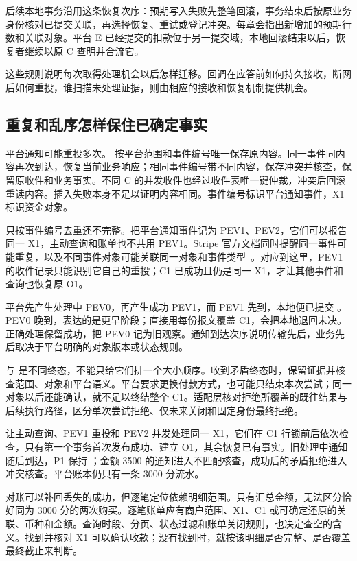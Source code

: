后续本地事务沿用这条恢复次序：预期写入失败先整笔回滚，事务结束后按原业务身份核对已提交关联，再选择恢复、重试或登记冲突。每章会指出新增加的预期行数和关联对象。平台 E 已经提交的扣款位于另一提交域，本地回滚结束以后，恢复者继续以原 C 查明并合流它。

这些规则说明每次取得处理机会以后怎样迁移。回调在应答前如何持久接收，断网后如何重投，谁扫描未处理证据，则由相应的接收和恢复机制提供机会。

\subsection*{重复和乱序怎样保住已确定事实}

平台通知可能重投多次。 按平台范围和事件编号唯一保存原内容。同一事件同内容再次到达，恢复当前业务响应；相同事件编号带不同内容，保存冲突并核查，保留原收件和业务事实。不同 C 的并发收件也经过收件表唯一键仲裁，冲突后回滚重读内容。插入失败本身不足以证明内容相同。事件编号标识平台通知事件，X1 标识资金对象。

只按事件编号去重还不完整。把平台通知事件记为 PEV1、PEV2，它们可以报告同一 X1，主动查询和账单也不共用 PEV1。Stripe 官方文档同时提醒同一事件可能重复，以及不同事件对象可能关联同一对象和事件类型~\cite{stripe-webhooks}。对应到这里，PEV1 的收件记录只能识别它自己的重投；C1 已成功且仍是同一 X1，才让其他事件和查询也恢复原 O1。

平台先产生处理中 PEV0，再产生成功 PEV1，而 PEV1 先到，本地便已提交 。PEV0 晚到，表达的是更早阶段；直接用每份报文覆盖 C1，会把本地退回未决。正确处理保留成功，把 PEV0 记为旧观察。通知到达次序说明传输先后，业务先后取决于平台明确的对象版本或状态规则。


 与  是不同终态，不能只给它们排一个大小顺序。收到矛盾终态时，保留证据并核查范围、对象和平台语义。平台要求更换付款方式，也可能只结束本次尝试；同一对象以后还能确认，就不足以终结整个 C1。适配层核对拒绝所覆盖的既往结果与后续执行路径，区分单次尝试拒绝、仅未来关闭和固定身份最终拒绝。

让主动查询、PEV1 重投和 PEV2 并发处理同一 X1，它们在 C1 行锁前后依次检查，只有第一个事务首次发布成功、建立 O1，其余恢复已有事实。旧处理中通知随后到达，P1 保持 ；金额 3500 的通知进入不匹配核查，成功后的矛盾拒绝进入冲突核查。平台账本仍只有一条 3000 分流水。

对账可以补回丢失的成功，但逐笔定位依赖明细范围。只有汇总金额，无法区分恰好同为 3000 分的两次购买。逐笔账单应有商户范围、X1、C1 或可确定还原的关联、币种和金额。查询时段、分页、状态过滤和账单关闭规则，也决定查空的含义。找到并核对 X1 可以确认收款；没有找到时，就按该明细是否完整、是否覆盖最终截止来判断。

